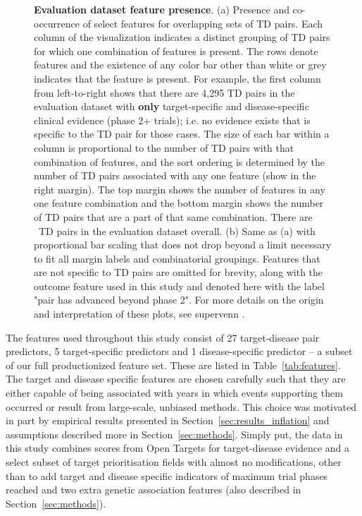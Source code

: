 \documentclass{article}
\begin{document}
\begin{figure}[!htb]
  \centering
  \captionsetup{width=.9\linewidth}
  \captionsetup[subfigure]{labelformat=empty}
  \qquad
  \caption{
    \textbf{Evaluation dataset feature presence}. 
    (a) Presence and co-occurrence of select features for overlapping sets of TD pairs. Each column of the visualization indicates a distinct grouping of TD pairs for which one combination of features is present. The rows denote features and the existence of any color bar other than white or grey indicates that the feature is present. For example, the first column from left-to-right shows that there are 4,295 TD pairs in the evaluation dataset with \textbf{only} target-specific and disease-specific clinical evidence (phase 2+ trials); i.e. no evidence exists that is specific to the TD pair for those cases. The size of each bar within a column is proportional to the number of TD pairs with that combination of features, and the sort ordering is determined by the number of TD pairs associated with any one feature (show in the right margin). The top margin shows the number of features in any one feature combination and the bottom margin shows the number of TD pairs that are a part of that same combination. There are \evaluationDatasetPairCount\ TD pairs in the evaluation dataset overall.
    (b) Same as (a) with proportional bar scaling that does not drop beyond a limit necessary to fit all margin labels and combinatorial groupings. Features that are not specific to TD pairs are omitted for brevity, along with the outcome feature used in this study and denoted here with the label "pair has advanced beyond phase 2". For more details on the origin and interpretation of these plots, see supervenn \cite{supervenn}.
  }
  \label{fig:feature_presence}
\end{figure}

The features used throughout this study consist of 27 target-disease pair predictors, 5 target-specific predictors and 1 disease-specific predictor -- a subset of our full productionized feature set. These are listed in Table~\ref{tab:features}. The target and disease specific features are chosen carefully such that they are either capable of being associated with years in which events supporting them occurred or result from large-scale, unbiased methods. This choice was motivated in part by empirical results presented in Section~\ref{sec:results_inflation} and assumptions described more in Section~\ref{sec:methods}. Simply put, the data in this study combines scores from Open Targets for target-disease evidence and a select subset of target prioritisation \cite{OTtargetPrioritisation} fields with almost no modifications, other than to add target and disease specific indicators of maximum trial phases reached and two extra genetic association features (also described in Section~\ref{sec:methods}).
\end{document}
